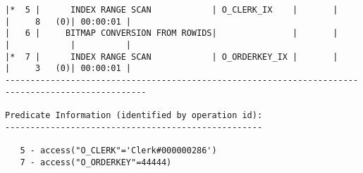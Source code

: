 \documentclass[11pt,a4paper,parskip=half]{scrartcl}
\begin{document}
\begin{lstlisting}
|*  5 |      INDEX RANGE SCAN            | O_CLERK_IX    |       |       |     8   (0)| 00:00:01 |                                                                                                                                                                                                           
|   6 |     BITMAP CONVERSION FROM ROWIDS|               |       |       |            |          |                                                                                                                                                                                                           
|*  7 |      INDEX RANGE SCAN            | O_ORDERKEY_IX |       |       |     3   (0)| 00:00:01 |                                                                                                                                                                                                           
--------------------------------------------------------------------------------------------------                                                                                                                                                                                                           
                                                                                                                                                                                                                                                                                                             
Predicate Information (identified by operation id):                                                                                                                                                                                                                                                          
---------------------------------------------------                                                                                                                                                                                                                                                          
                                                                                                                                                                                                                                                                                                             
   5 - access("O_CLERK"='Clerk#000000286')                                                                                                                                                                                                                                                                   
   7 - access("O_ORDERKEY"=44444)   
\end{lstlisting}
\end{document}
